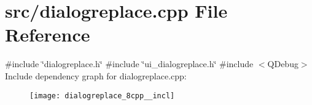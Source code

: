 \section{src/dialogreplace.cpp File Reference}
\label{dialogreplace_8cpp}
{\ttfamily \#include \char`\"{}dialogreplace.\+h\char`\"{}}\newline
{\ttfamily \#include \char`\"{}ui\+\_\+dialogreplace.\+h\char`\"{}}\newline
{\ttfamily \#include $<$Q\+Debug$>$}\newline
Include dependency graph for dialogreplace.\+cpp\+:\nopagebreak
\begin{figure}[H]
\begin{center}
\leavevmode
\texttt{[image: dialogreplace\_8cpp\_\_incl]}
\end{center}
\end{figure}
